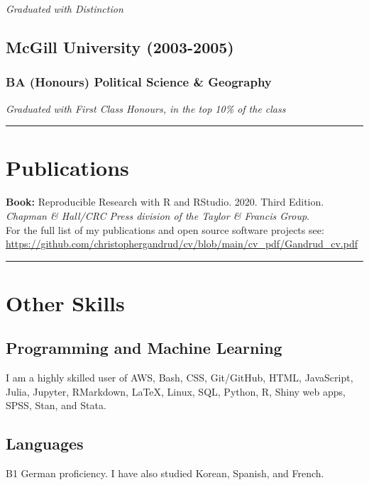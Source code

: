 \documentclass[a4paper]{article}
\begin{document}
{\emph{Graduated with Distinction}}

\subsection*{McGill University (2003-2005)}
\subsubsection*{BA (Honours) Political Science \& Geography}

{\emph{Graduated with First Class Honours, in the top 10\% of the class}}

\vspace{0.25cm}
\medskip\hrule height 1pt
\vspace{0.5cm}


\section*{Publications}

\textbf{Book:} Reproducible Research with R and RStudio. 2020. Third Edition. {\emph{Chapman \& Hall/CRC Press division of the Taylor \& Francis Group}}. \\

\noindent For the full list of my publications and open source software projects see: \url{https://github.com/christophergandrud/cv/blob/main/cv_pdf/Gandrud_cv.pdf}

\vspace{0.5cm}
\medskip\hrule height 1pt
\vspace{0.5cm}

\section*{Other Skills}

\subsection*{Programming and Machine Learning}

I am a highly skilled user of AWS, Bash, CSS, Git/GitHub, HTML, JavaScript, Julia, Jupyter, RMarkdown, LaTeX, Linux, SQL, Python, R, Shiny web apps, SPSS, Stan, and Stata.

\subsection*{Languages}

B1 German proficiency. I have also studied Korean, Spanish, and French. 
\end{document}
